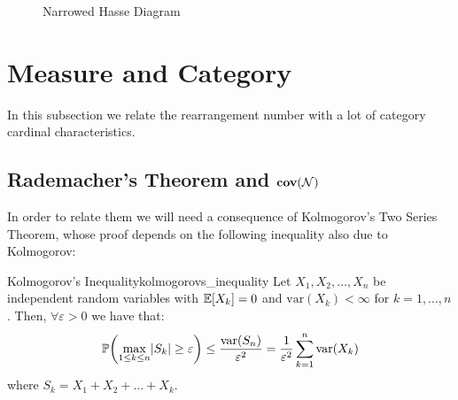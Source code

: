 \begin{figure}[ht]
\centering

\caption{Narrowed Hasse Diagram}
\label{fig:rearrangement_narrowed}
\end{figure}

\section{Measure and Category}

In this subsection we relate the rearrangement number with a lot of category cardinal characteristics.

\subsection{Rademacher's Theorem and \texorpdfstring{$\mathbf{cov}(\mathcal{N})$}{covN}}

In order to relate them we will need a consequence of Kolmogorov's Two Series Theorem, whose proof depends on the following inequality also due to Kolmogorov:

\begin{lemma}{Kolmogorov's Inequality}{kolmogorovs_inequality}
    Let $X_1,X_2,\dots,X_n$ be independent random variables with $\mathbb{E}[X_k]=0$ and $\text{var}(X_k)<\infty$ for $k=1,\dots,n$. Then, $\forall\varepsilon>0$ we have that:
    $$\mathbb{P}{\left(\max_{1\leq k\leq n}\lvert S_k\rvert\geq\varepsilon\right)}\leq\frac{\text{var}(S_n)}{\varepsilon^2}=\frac1{\varepsilon^2}\sum_{k=1}^n\text{var}(X_k)$$
    where $S_k=X_1+X_2+\dots+X_k$.
\end{lemma}

